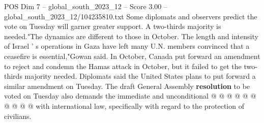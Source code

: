 \begin{textsample}{POS Dim 7 – global\_south\_2023\_12 – Score 3.00 – global\_south\_2023\_12/104235810.txt}
Some diplomats and observers predict the vote on Tuesday will garner greater support.
A two-thirds majority is needed."The dynamics are different to those in October.
The length and intensity of Israel ' s operations in Gaza have left many U.N. members convinced that a ceasefire is essential,"Gowan said.
In October, Canada put forward an amendment to reject and condemn the Hamas attack in October, but it failed to get the two-thirds majority needed.
Diplomats said the United States plans to put forward a similar amendment on Tuesday.
The draft General Assembly \textbf{resolution} to be voted on Tuesday also demands the immediate and unconditional @ @ @ @ @ @ @ @ @ @ with international law, specifically with regard to the protection of civilians.

\end{textsample}
